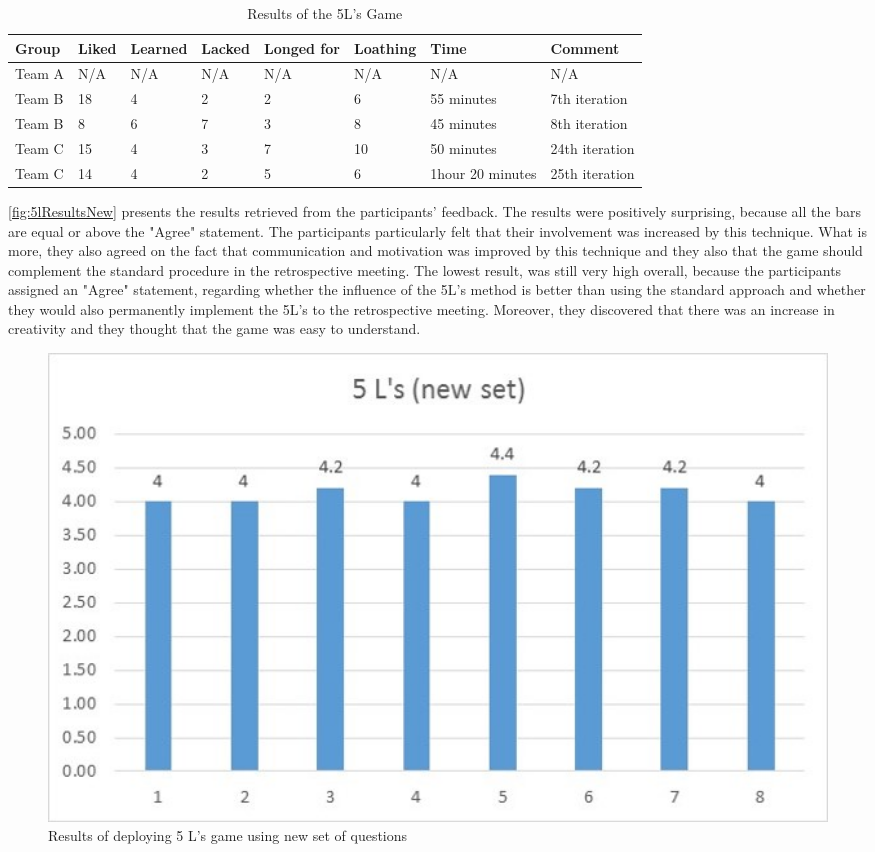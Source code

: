 \begin{table}[!htbp]
	\caption{Results of the 5L's Game}
	\label{tab:groups-5LTeamResultsN}
	\begin{tabularx}{\textwidth}{|X|X|X|X|X|X|X|X|}
	\hline
		Group & Liked & Learned & Lacked & Longed for & Loathing & Time & Comment\\ \hline
		Team A &  N/A & N/A & N/A &  N/A & N/A & N/A & N/A \\ \hline
		Team B & 18 & 4 & 2 & 2 & 6 & 55 minutes & 7th iteration\\ \hline
        Team B & 8 & 6 & 7 & 3 & 8 & 45 minutes & 8th iteration\\ \hline
        Team C & 15 & 4 & 3 & 7 & 10 & 50 minutes & 24th iteration\\ \hline
        Team C & 14 & 4 & 2 & 5 & 6 & 1hour 20 minutes & 25th iteration\\ \hline
	\end{tabularx}
\end{table}

\autoref{fig:5lResultsNew} presents the results retrieved from the participants' feedback. The results were positively surprising, because all the bars are equal or above the "Agree" statement. The participants  particularly felt that their involvement was increased by this technique. What is more, they also agreed on the fact that communication and motivation was improved by this technique and they also that the game should complement the standard procedure in the retrospective meeting. The lowest result, was still very high overall, because the participants assigned an "Agree" statement, regarding whether the influence of the 5L’s method is better than using the standard approach and whether they would also permanently implement the 5L’s to the retrospective meeting. Moreover, they discovered that there was an increase in creativity and they thought that the game was easy to understand.

\begin{figure}[!htbp]
\caption{Results of deploying 5 L's game using new set of questions}
\label{fig:5lResultsNew}
\centering
\includegraphics[width=1\textwidth]{charts/5LNewSet}
\end{figure}


